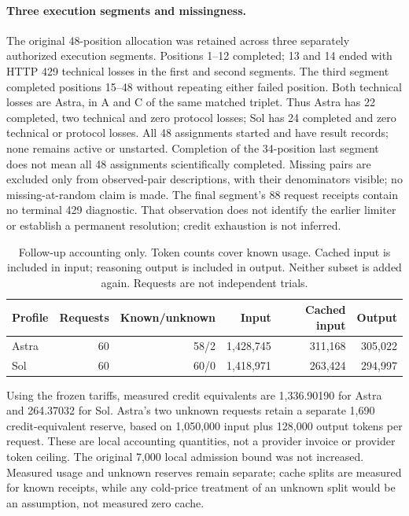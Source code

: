 \paragraph{Three execution segments and missingness.}
The original 48-position allocation was retained across three separately
authorized execution segments. Positions 1--12 completed; 13 and 14 ended
with HTTP 429 technical losses in the first and second segments. The third
segment completed positions 15--48 without repeating either failed position.
Both technical losses are Astra, in A and C of the same matched triplet.
Thus Astra has 22 completed, two technical and zero protocol losses; Sol has
24 completed and zero technical or protocol losses. All 48 assignments started
and have result records; none remains active or unstarted. Completion of the
34-position last segment does not mean all 48 assignments scientifically
completed. Missing pairs are excluded only from observed-pair descriptions,
with their denominators visible; no missing-at-random claim is made.
The final segment's 88 request receipts contain no terminal 429 diagnostic.
That observation does not identify the earlier limiter or establish a
permanent resolution; credit exhaustion is not inferred.

\begin{table}[htbp]
\centering\small
\begin{tabular}{lrrrrr}\toprule
Profile & Requests & Known/unknown & Input & Cached input & Output\\\midrule
Astra & 60 & 58/2 & 1,428,745 & 311,168 & 305,022\\
Sol & 60 & 60/0 & 1,418,971 & 263,424 & 294,997\\\bottomrule
\end{tabular}
\caption{Follow-up accounting only. Token counts cover known usage.
Cached input is included in input; reasoning output is included in output.
Neither subset is added again. Requests are not independent trials.}
\label{tab:followup-usage}
\end{table}

Using the frozen tariffs, measured credit equivalents are 1,336.90190 for
Astra and 264.37032 for Sol. Astra's two unknown requests retain a separate
1,690 credit-equivalent reserve, based on 1,050,000 input plus 128,000 output
tokens per request. These are local accounting quantities, not a provider
invoice or provider token ceiling. The original 7,000 local admission bound
was not increased. Measured usage and unknown reserves remain separate;
cache splits are measured for known receipts, while any cold-price treatment
of an unknown split would be an assumption, not measured zero cache.


